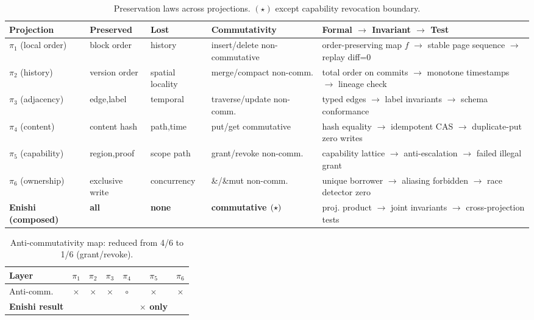 \documentclass[10pt]{article}
\begin{document}
\begin{table}[h]
\centering
\small
\begin{tabularx}{\linewidth}{l Y Y Y Y}
\toprule
Projection & Preserved & Lost & Commutativity & Formal $\to$ Invariant $\to$ Test \\
\midrule
$\pi_1$ (local order) & block order & history & insert/delete non-commutative & order-preserving map $f$ $\to$ stable page sequence $\to$ replay diff=0 \\
$\pi_2$ (history) & version order & spatial locality & merge/compact non-comm. & total order on commits $\to$ monotone timestamps $\to$ lineage check \\
$\pi_3$ (adjacency) & edge,label & temporal & traverse/update non-comm. & typed edges $\to$ label invariants $\to$ schema conformance \\
$\pi_4$ (content) & content hash & path,time & put/get commutative & hash equality $\to$ idempotent CAS $\to$ duplicate-put zero writes \\
$\pi_5$ (capability) & region,proof & scope path & grant/revoke non-comm. & capability lattice $\to$ anti-escalation $\to$ failed illegal grant \\
$\pi_6$ (ownership) & exclusive write & concurrency & \&/\&mut non-comm. & unique borrower $\to$ aliasing forbidden $\to$ race detector zero \\
\textbf{Enishi (composed)} & \textbf{all} & \textbf{none} & \textbf{commutative $\small(\star)$} & proj. product $\to$ joint invariants $\to$ cross-projection tests \\
\bottomrule
\end{tabularx}
\caption{Preservation laws across projections. $(\star)$ except capability revocation boundary.}
\label{tab:preserve}
\end{table}

\begin{table}[h]
\centering
\small
\begin{tabular}{l c c c c c c}
\toprule
Layer & $\pi_1$ & $\pi_2$ & $\pi_3$ & $\pi_4$ & $\pi_5$ & $\pi_6$ \\
\midrule
Anti-comm. & $\times$ & $\times$ & $\times$ & $\circ$ & $\times$ & $\times$ \\
\textbf{Enishi result} &  &  &  &  & \textbf{$\times$ only} &  \\
\bottomrule
\end{tabular}
\caption{Anti-commutativity map: reduced from 4/6 to 1/6 (grant/revoke).}
\label{tab:anti}
\end{table}
\end{document}
